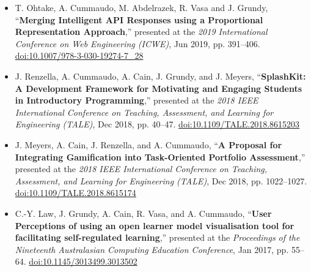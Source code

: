 {\begin{itemize}
  \item T. Ohtake, A. Cummaudo, M. Abdelrazek, R. Vasa and J. Grundy, ``\textbf{Merging Intelligent API Responses using a Proportional Representation Approach},'' presented at the \textit{2019 International Conference on Web Engineering (ICWE)}, Jun 2019, pp. 391--406. \href{https://doi.org/10.1007/978-3-030-19274-7_28}{doi:10.1007/978-3-030-19274-7\_28}\\
  \item J. Renzella, A. Cummaudo, A. Cain, J. Grundy, and J. Meyers, ``\textbf{SplashKit: A Development Framework for Motivating and Engaging Students in Introductory Programming},'' presented at the \textit{2018 IEEE International Conference on Teaching, Assessment, and Learning for Engineering (TALE)}, Dec 2018, pp. 40--47. \href{http://doi.org/10.1109/TALE.2018.8615203}{doi:10.1109/TALE.2018.8615203}\\
  \item J. Meyers, A. Cain, J. Renzella, and A. Cummaudo, ``\textbf{A Proposal for Integrating Gamification into Task-Oriented Portfolio Assessment},'' presented at the \textit{2018 IEEE International Conference on Teaching, Assessment, and Learning for Engineering (TALE)}, Dec 2018, pp. 1022--1027. \href{http://doi.org/10.1109/TALE.2018.8615174}{doi:10.1109/TALE.2018.8615174}\\
  \item C.-Y. Law, J. Grundy, A. Cain, R. Vasa, and A. Cummaudo, ``\textbf{User Perceptions of using an open learner model visualisation tool for facilitating self-regulated learning},'' presented at the \textit{Proceedings of the Nineteenth Australasian Computing Education Conference}, Jan 2017, pp. 55--64. \href{http://doi.org/10.1145/3013499.3013502}{doi:10.1145/3013499.3013502}
\end{itemize}
}

%
%
%  
